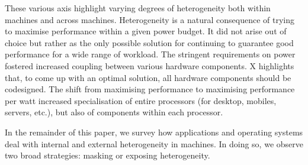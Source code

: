 These various axis highlight varying degrees of heterogeneity both within
machines and across machines. Heterogeneity is a natural consequence of 
trying to maximise performance within a given power budget. It did not arise
out of choice but rather as the only possible solution for continuing to guarantee
good performance for a wide range of workload. The stringent requirements
on power fostered increased coupling between various hardware components.
X  highlights that, to come up with an optimal solution, all hardware components
should be codesigned. The shift from maximising performance to maximising performance
per watt increased specialisation of entire processors (for desktop, mobiles,
servers, etc.), but also of components within each processor. 

In the remainder of this paper, we survey how applications and operating
systems deal with internal and external heterogeneity in machines. 
In doing so, we observe two broad strategies: masking or exposing heterogeneity. 



